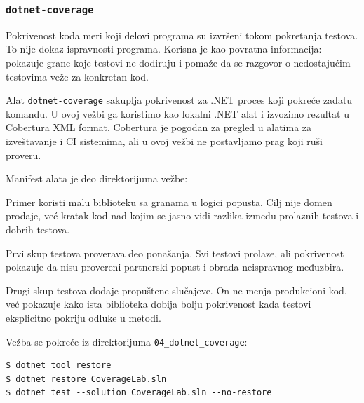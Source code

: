 \subsubsection{\texttt{dotnet-coverage}}\label{dotnet-coverage}

Pokrivenost koda meri koji delovi programa su izvršeni tokom pokretanja testova. To nije dokaz ispravnosti programa. Korisna je kao povratna informacija: pokazuje grane koje testovi ne dodiruju i pomaže da se razgovor o nedostajućim testovima veže za konkretan kod.

Alat \texttt{dotnet-coverage} sakuplja pokrivenost za .NET proces koji pokreće zadatu komandu. U ovoj vežbi ga koristimo kao lokalni .NET alat i izvozimo rezultat u Cobertura XML format. Cobertura je pogodan za pregled u alatima za izveštavanje i CI sistemima, ali u ovoj vežbi ne postavljamo prag koji ruši proveru.

Manifest alata je deo direktorijuma vežbe:


Primer koristi malu biblioteku sa granama u logici popusta. Cilj nije domen prodaje, već kratak kod nad kojim se jasno vidi razlika između prolaznih testova i dobrih testova.




Prvi skup testova proverava deo ponašanja. Svi testovi prolaze, ali pokrivenost pokazuje da nisu provereni partnerski popust i obrada neispravnog međuzbira.



Drugi skup testova dodaje propuštene slučajeve. On ne menja produkcioni kod, već pokazuje kako ista biblioteka dobija bolju pokrivenost kada testovi eksplicitno pokriju odluke u metodi.



Vežba se pokreće iz direktorijuma \texttt{04\_dotnet\_coverage}:

\begin{verbatim}
$ dotnet tool restore
$ dotnet restore CoverageLab.sln
$ dotnet test --solution CoverageLab.sln --no-restore
\end{verbatim}

